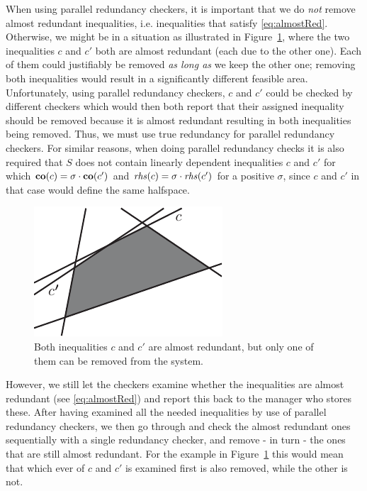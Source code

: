 When using parallel redundancy checkers, it is important that we do \emph{not} remove almost redundant inequalities, i.e. inequalities that satisfy \eqref{eq:almostRed}. Otherwise, we might be in a situation as illustrated in Figure~\ref{fig:almostRedundant}, where the two inequalities $c$ and $c'$ both are almost redundant (each due to the other one). Each of them could justifiably be removed \emph{as long as} we keep the other one; removing both inequalities would result in a significantly different feasible area. Unfortunately, using parallel redundancy checkers, $c$ and $c'$ could be checked by different checkers which would then both report that their assigned inequality should be removed because it is almost redundant resulting in both inequalities being removed. Thus, we must use true redundancy for parallel redundancy checkers.
For similar reasons, when doing parallel redundancy checks it is also required that $S$ does not contain linearly dependent inequalities $c$ and $c'$ for which $\mathbf{co}(c)=\sigma\cdot \mathbf{co}(c')$ and $\mathit{rhs}(c)=\sigma\cdot \mathit{rhs}(c')$ for a positive $\sigma$, since $c$ and $c'$ in that case would define the same halfspace.

\begin{figure}[htbp]
	\centering
		\includegraphics{figures/almostRedundant.pdf}
	\caption{Both inequalities $c$ and $c'$ are almost redundant, but only one of them can be removed from the system.}
	\label{fig:almostRedundant}
\end{figure}

However, we still let the checkers examine whether the inequalities are almost redundant (see \eqref{eq:almostRed}) and report this back to the manager who stores these. After having examined all the needed inequalities by use of parallel redundancy checkers, we then go through and check the almost redundant ones sequentially with a single redundancy checker, and remove - in turn - the ones that are still almost redundant. For the example in Figure~\ref{fig:almostRedundant} this would mean that which ever of $c$ and $c'$ is examined first is also removed, while the other is not.

